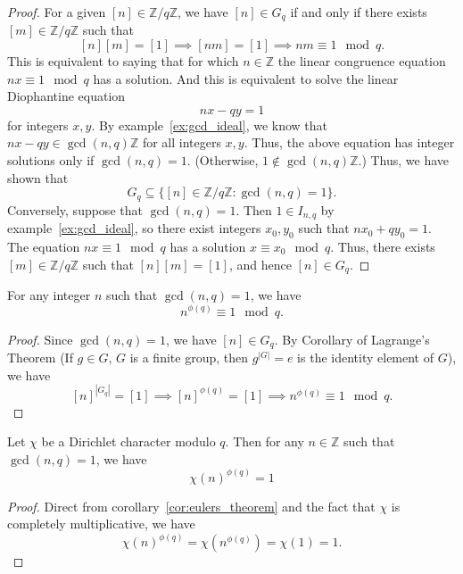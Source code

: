 \documentclass{elegantbook}
\begin{document}
\begin{proof}
  For a given $[n] \in \mathbb{Z}/q\mathbb{Z}$, we have $[n] \in G_q$ if and only if there exists $[m] \in \mathbb{Z}/q\mathbb{Z}$ such that
  \[
    [n][m] = [1] \implies [nm] = [1] \implies nm \equiv 1 \mod q.
  \]
  This is equivalent to saying that for which $n\in \mathbb{Z}$ the linear congruence equation $nx \equiv 1 \mod q$ has a solution. And this is equivalent to solve the linear Diophantine equation
  \[
    nx - qy = 1
  \]
  for integers $x,y$. By example~\ref{ex:gcd_ideal}, we know that $nx - qy \in \gcd(n,q) \mathbb{Z}$ for all integers $x,y$. Thus, the above equation has integer solutions only if $\gcd(n,q) = 1$. (Otherwise, $1 \notin \gcd(n,q) \mathbb{Z}$.) Thus, we have shown that
  \[
    G_q \subseteq \{ [n] \in \mathbb{Z}/q\mathbb{Z} : \gcd(n,q) = 1 \}.
  \]
  Conversely, suppose that $\gcd(n,q) = 1$. Then $1 \in I_{n,q}$ by example~\ref{ex:gcd_ideal}, so there exist integers $x_0,y_0$ such that $n x_0 + q y_0 = 1$. The equation $n x \equiv 1 \mod q$ has a solution $x \equiv x_0 \mod q$. Thus, there exists $[m] \in \mathbb{Z}/q\mathbb{Z}$ such that $[n][m] = [1]$, and hence $[n] \in G_q$.
\end{proof}

\begin{corollary} \label{cor:eulers_theorem}
  For any integer $n$ such that $\gcd(n,q) = 1$, we have
  \[
    n^{\phi(q)} \equiv 1 \mod q.
  \]
\end{corollary}

\begin{proof}
  Since $\gcd(n,q) = 1$, we have $[n] \in G_q$. By Corollary of Lagrange's Theorem (If $g\in G$, $G$ is a finite group, then $g^{|G|}=e$ is the identity element of $G$), we have
  \[
    [n]^{|G_q|} = [1] \implies [n]^{\phi(q)} = [1] \implies n^{\phi(q)} \equiv 1 \mod q.
  \]
\end{proof}

\begin{corollary} \label{cor:dirichlet_character_root_of_unity}
  Let $\chi$ be a Dirichlet character modulo $q$. Then for any $n \in \mathbb{Z}$ such that $\gcd(n,q) = 1$, we have
  \[
    \chi(n)^{\phi(q)} =  1
  \]
\end{corollary}

\begin{proof}
  Direct from corollary~\ref{cor:eulers_theorem} and the fact that $\chi$ is completely multiplicative, we have
  \[
    \chi(n)^{\phi(q)} = \chi(n^{\phi(q)}) = \chi(1) = 1.
  \]
\end{proof}
\end{document}
